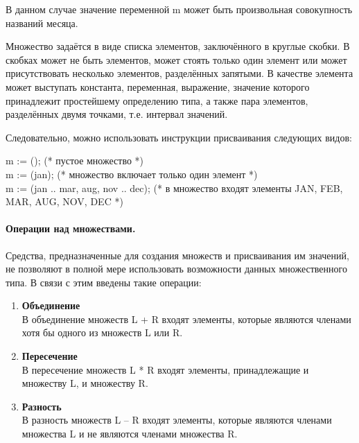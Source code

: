 \documentclass[10pt]{report}
\begin{document}
В данном случае значение переменной m может быть произвольная совокупность названий месяца.

Множество задаётся в виде списка элементов, заключённого в круглые скобки. В скобках может не быть элементов, может стоять только один элемент или может присутствовать несколько элементов, разделённых запятыми. В качестве элемента может выступать константа, переменная, выражение, значение которого принадлежит простейшему определению типа, а также пара элементов, разделённых двумя точками, т.е. интервал значений.

Следовательно, можно использовать инструкции присваивания следующих видов:
\begin{flushleft}
\hspace*{5mm} m := (); (* пустое множество *) \\
\hspace*{5mm} m := (jan); (* множество включает только один элемент *) \\
\hspace*{5mm} m := (jan .. mar, aug, nov .. dec); (* в множество входят элементы JAN, FEB, MAR, AUG, \hspace*{5mm} NOV, DEC *) \\
\end{flushleft}

\paragraph{Операции над множествами.}
Средства, предназначенные для создания множеств и присваивания им значений, не позволяют в полной мере использовать возможности данных множественного типа. В связи с этим введены такие операции:
\begin{enumerate}
\item
\textbf{Объединение}\\
В объединение множеств L + R входят элементы, которые являются членами хотя бы одного из множеств L или R.
\item
\textbf{Пересечение}\\
В пересечение множеств L * R входят элементы, принадлежащие и множеству L, и множеству R.
\item
\textbf{Разность}\\
В разность множеств L -- R входят элементы, которые являются членами множества L и не являются членами множества R.
\end{enumerate}
\end{document}
